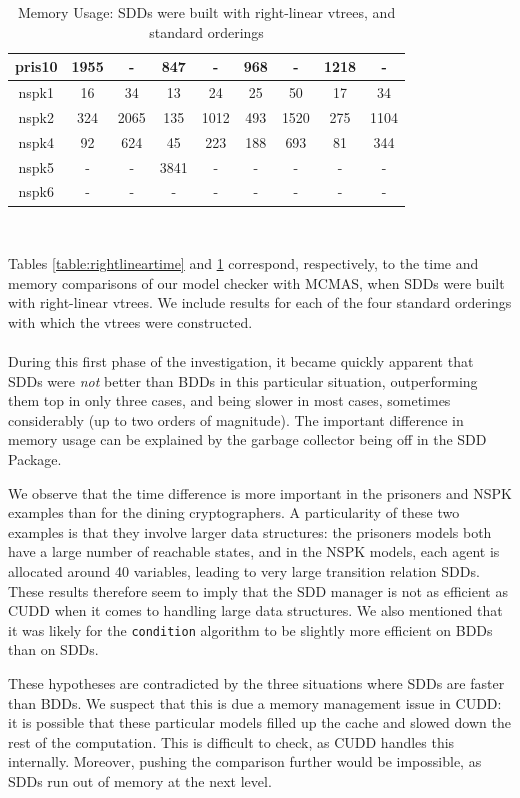 \documentclass[11pt]{report}
\begin{document}
\begin{table}
\begin{tabular}{|*{9}{c|}}
pris10 & 1955 & - & 847 & - & 968 & - & 1218 & -\\ \hline
nspk1 & 16 & 34 & 13 & 24 & 25 & 50 & 17 & 34 \\ \hline
nspk2 & 324 & 2065 & 135 & 1012 & 493 & 1520 & 275 & 1104 \\ \hline
nspk4 & 92 & 624 & 45 & 223  & 188 & 693 & 81 & 344 \\ \hline
nspk5 & - & - & 3841 & - & - & - & - & -\\ \hline
nspk6 & -&- &- &-  &- &- &- &- \\ \hline
\end{tabular}
\\
\caption{Memory Usage: SDDs were built with right-linear vtrees, and standard orderings}
\label{table:rightlinearmemory}
\end{table}
 
Tables \ref{table:rightlineartime} and \ref{table:rightlinearmemory} correspond, respectively, to the time and memory comparisons of our model checker with MCMAS, when SDDs were built with right-linear vtrees. We include results for each of the four standard orderings with which the vtrees were constructed. 
\\\\
During this first phase of the investigation, it became quickly apparent that SDDs were \textit{not }better than BDDs in this particular situation, outperforming them top
in only three cases, and being slower in most cases, sometimes considerably (up to two orders of magnitude). The important difference in memory usage can be explained by the garbage collector being off in the SDD Package. 

We observe that the time difference is more important in the prisoners and NSPK examples than for the dining cryptographers. A particularity of these two examples is that they involve larger data structures: the prisoners models both have a large number of reachable states, and in the NSPK models, each agent is allocated around 40 variables, leading to very large transition relation SDDs.
These results therefore seem to imply that the SDD manager is not as efficient as CUDD when it comes to handling large data structures. We also mentioned that it was likely for the \texttt{condition} algorithm to be slightly more efficient on BDDs than on SDDs. 

These hypotheses are contradicted by the three situations where SDDs are faster than BDDs. We suspect that this is due a memory management issue in CUDD: it is possible that these particular models filled up the cache and slowed down the rest of the computation. This is difficult to check, as CUDD handles this internally. Moreover, pushing the comparison further would be impossible, as SDDs run out of memory at the next level. 
\end{document}
